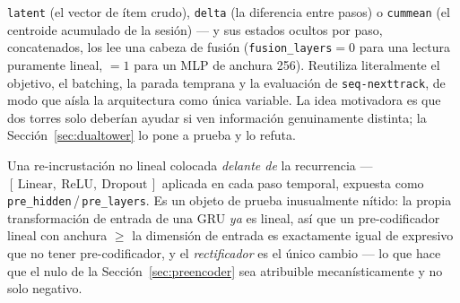 \documentclass[11pt]{article}
\begin{document}
\begin{description}
  \texttt{latent} (el vector de ítem crudo), \texttt{delta} (la diferencia entre
  pasos) o \texttt{cummean} (el centroide acumulado de la sesión) --- y sus
  estados ocultos por paso, concatenados, los lee una cabeza de fusión
  (\texttt{fusion\_layers}${}=0$ para una lectura puramente lineal, ${}=1$ para un
  MLP de anchura 256). Reutiliza literalmente el objetivo, el batching, la parada
  temprana y la evaluación de \texttt{seq-nexttrack}, de modo que aísla la
  arquitectura como única variable. La idea motivadora es que dos torres solo
  deberían ayudar si ven información genuinamente distinta; la
  Sección~\ref{sec:dualtower} lo pone a prueba y lo refuta.
  \item[Pre-codificador por paso.] Una re-incrustación no lineal colocada
  \emph{delante de} la recurrencia --- $[\,\text{Linear},\ \text{ReLU},\
  \text{Dropout}\,]$ aplicada en cada paso temporal, expuesta como
  \texttt{pre\_hidden}\,/\,\texttt{pre\_layers}. Es un objeto de prueba
  inusualmente nítido: la propia transformación de entrada de una GRU \emph{ya} es
  lineal, así que un pre-codificador lineal con anchura $\ge$ la dimensión de
  entrada es exactamente igual de expresivo que no tener pre-codificador, y el
  \emph{rectificador} es el único cambio --- lo que hace que el nulo de la
  Sección~\ref{sec:preencoder} sea atribuible mecanísticamente y no solo
  negativo.
\end{description}
\end{document}

